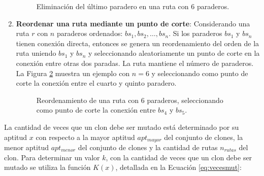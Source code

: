 \begin{enumerate}
\begin{figure}[!htb]
\begin{center}
\end{center}
\caption{Eliminación del último paradero en una ruta con 6 paraderos.}
\label{fig:mut2}
\end{figure}

\item \textbf{Reordenar una ruta mediante un punto de corte}: Considerando una ruta $r$ con $n$ paraderos ordenados: $bs_1, bs_2, \ldots, bs_n$. Si los paraderos $bs_1$ y $bs_n$ tienen conexión directa, entonces se genera un reordenamiento del orden de la ruta uniendo $bs_1$ y $bs_n$ y seleccionando aleatoriamente un punto de corte en la conexión entre otras dos paradas. La ruta mantiene el número de paraderos. La Figura \ref{fig:mut3} muestra un ejemplo con $n=6$ y seleccionando como punto de corte la conexión entre el cuarto y quinto paradero.

\begin{figure}[!htb]
\begin{center}
\end{center}
\caption{Reordenamiento de una ruta con 6 paraderos, seleccionando como punto de corte la conexión entre $bs_4$ y $bs_5$.}
\label{fig:mut3}
\end{figure}
\end{enumerate}

La cantidad de veces que un clon debe ser mutado está determinado por su aptitud $x$ con respecto a la mayor aptitud $apt_{mayor}$ del conjunto de clones, la menor aptitud $apt_{menor}$ del conjunto de clones y la cantidad de rutas $n_{rutas}$ del clon. Para determinar un valor $k$, con la cantidad de veces que un clon debe ser mutado se utiliza la función $K(x)$, detallada en la Ecuación \eqref{eq:vecesmut}:

